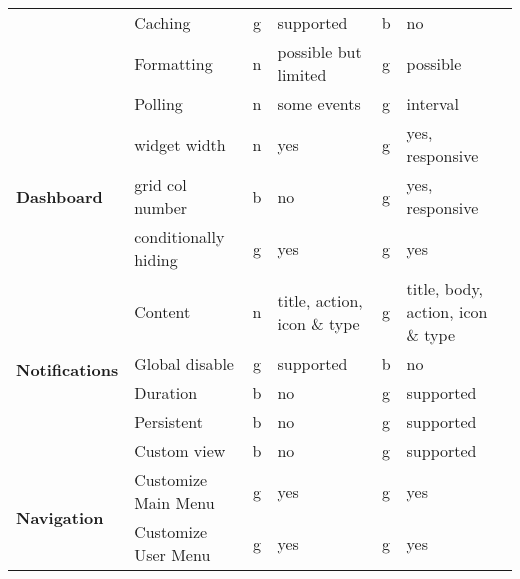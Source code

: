 \begin{table}[]
{\begin{tabular}{llclcl}
            & Caching                & g           & supported                       & b           & no                                       \\
            & Formatting             & n           & possible but limited            & g           & possible                                 \\
            & Polling                & n           & some events                     & g           & interval                                 \\
            \hline
            \multirow{3}{*}{\textbf{Dashboard}}      & widget width           & n           & yes                             & g           & yes, responsive                          \\
            & grid col number        & b           & no                              & g           & yes, responsive                          \\
            & conditionally hiding   & g           & yes                             & g           & yes                                      \\
            \hline
            \multirow{5}{*}{\textbf{Notifications}}  & Content                & n           & title, action, icon \& type     & g           & title, body, action, icon \& type        \\
            & Global disable         & g           & supported                       & b           & no                                       \\
            & Duration               & b           & no                              & g           & supported                                \\
            & Persistent             & b           & no                              & g           & supported                                \\
            & Custom view            & b           & no                              & g           & supported                                \\
            \hline
            \multirow{2}{*}{\textbf{Navigation}}     & Customize Main Menu    & g           & yes                             & g           & yes                                      \\
            & Customize User Menu    & g           & yes                             & g           & yes                                      \\
            \hline

\end{tabular}}
\end{table}

